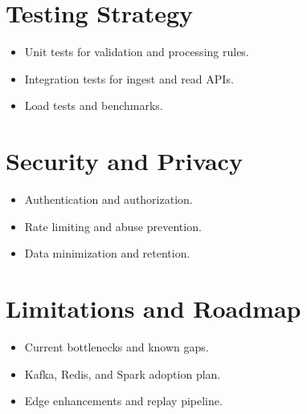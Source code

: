 \documentclass[12pt, a4paper]{article}
\begin{document}
\section{Testing Strategy}
\begin{itemize}[leftmargin=*]
    \item Unit tests for validation and processing rules.
    \item Integration tests for ingest and read APIs.
    \item Load tests and benchmarks.
\end{itemize}

\section{Security and Privacy}
\begin{itemize}[leftmargin=*]
    \item Authentication and authorization.
    \item Rate limiting and abuse prevention.
    \item Data minimization and retention.
\end{itemize}

\section{Limitations and Roadmap}
\begin{itemize}[leftmargin=*]
    \item Current bottlenecks and known gaps.
    \item Kafka, Redis, and Spark adoption plan.
    \item Edge enhancements and replay pipeline.
\end{itemize}
\end{document}
